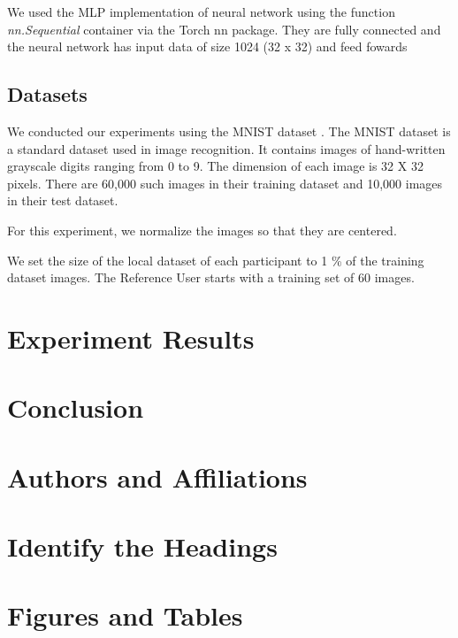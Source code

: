 \documentclass[conference]{IEEEtran}
\begin{document}
We used the MLP implementation of neural network using the function \textit{nn.Sequential} container via the Torch nn package. They are
fully connected and the neural network has input data of size 1024 (32 x 32) and feed fowards

\subsection{Datasets}
We conducted our experiments using the MNIST dataset \cite{deng2012mnist}. The MNIST dataset is a standard dataset used in image
recognition.
It contains images of hand-written grayscale digits ranging from 0 to 9. The dimension of each image is 32 X 32 pixels. There
are 60,000 such images in their training dataset and 10,000 images in their test dataset.

For this experiment, we normalize the images so that they are centered. 

We set the size of the local dataset of each participant to 1 \% of the training dataset images. 
The Reference User starts with a training set of 60 images.




\section{Experiment Results}

\section{Conclusion}


\section{Authors and Affiliations}


\section{Identify the Headings}


\section{Figures and Tables}





\end{document}
